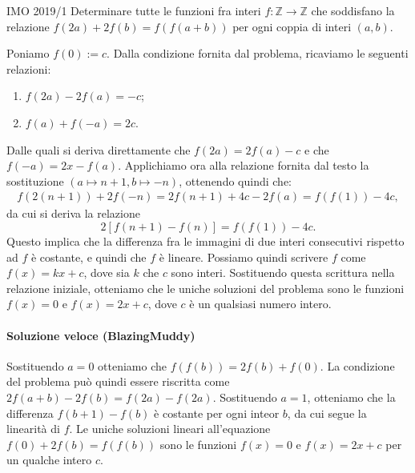 \documentclass{article}
\begin{document}
\begin{proposition}{IMO 2019/1}{}
	Determinare tutte le funzioni fra interi
	$f:\mathbb{Z}\rightarrow \mathbb{Z}$
	che soddisfano la relazione $f(2a)+2f(b)=f(f(a+b))$ per ogni coppia
	di interi $(a,b)$.
\end{proposition}

Poniamo $f(0):=c$.
Dalla condizione fornita dal problema, ricaviamo le seguenti relazioni:
\begin{enumerate}
	\item $f(2a)-2f(a)=-c$;
	\item $f(a)+f(-a)=2c$.
\end{enumerate}

Dalle quali si deriva direttamente che $f(2a)=2f(a)-c$ e che
$f(-a)=2x-f(a)$. Applichiamo ora alla relazione fornita dal
testo la sostituzione $(a\mapsto n+1,b\mapsto -n)$, ottenendo quindi che:
\begin{align*}
	f(2(n+1))+2f(-n)=2f(n+1)+4c-2f(a)
						 =f(f(1))-4c,
\end{align*}
da cui si deriva la relazione
\begin{equation*}
	2[f(n+1)-f(n)]=f(f(1))-4c.
\end{equation*}
Questo implica che la differenza fra le immagini di due interi
consecutivi rispetto ad $f$ è costante, e quindi che $f$ è lineare.
Possiamo quindi scrivere $f$ come $f(x)=kx+c$, dove sia $k$ che $c$
sono interi. Sostituendo questa scrittura nella relazione iniziale, 
otteniamo che le uniche soluzioni del problema sono le funzioni
$f(x)=0$ e $f(x)=2x+c$, dove $c$ è un qualsiasi numero intero.

\paragraph{Soluzione veloce (BlazingMuddy)}
Sostituendo $a=0$ otteniamo che $f(f(b))=2f(b)+f(0)$.
La condizione del problema può quindi essere riscritta come
$2f(a+b)-2f(b)=f(2a)-f(2a)$. Sostituendo $a=1$, otteniamo che
la differenza $f(b+1)-f(b)$ è costante per ogni inteor $b$, da
cui segue la linearità di $f$. Le uniche soluzioni
lineari all'equazione $f(0)+2f(b)=f(f(b))$ sono le funzioni
$f(x)=0$ e $f(x)=2x+c$ per un qualche intero $c$.
\end{document}
